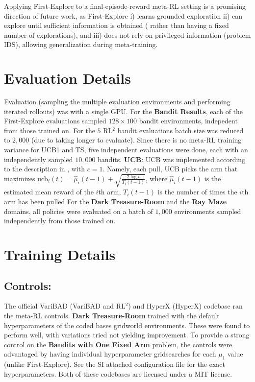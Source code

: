 \documentclass{article}
\begin{document}
Applying First-Explore to a final-episode-reward meta-RL setting is a promising direction of future work, as First-Explore i) learns grounded exploration ii) can explore until sufficient information is obtained ( rather than having a fixed number of explorations), and iii) does not rely on privileged information (problem IDS), allowing generalization during meta-training.
\FloatBarrier
\section{Evaluation Details} \label{ap:evaldet}
Evaluation (sampling the multiple evaluation environments and performing iterated rollouts) was with a single GPU. For the \textbf{Bandit Results}, each of the First-Explore evaluations sampled \(128 \times 100\) bandit environments, indepedent from those trained on. For the \(5\) RL\(^2\) bandit evaluations batch size was reduced to \(2,000\) (due to taking longer to evaluate). Since there is no meta-RL training variance for UCB1 and TS, five independent evaluations were done, each with an independently sampled \(10,000\) bandits.
\textbf{UCB}: UCB was implemented according to the description in \cite{rl2}, with \(c=1\). Namely, each pull, UCB picks the arm that maximizes \(\text{ucb}_i(t) = \hat{\mu}_i(t - 1) + \sqrt{\frac{2\log t}{T_i(t-1)}}\), where \(\hat{\mu}_i(t - 1)\) is the estimated mean reward of the \(i\)th arm, \(T_i(t-1)\) is the number of times the \(i\)th arm has been pulled
For the \textbf{Dark Treasure-Room} and the \textbf{Ray Maze} domains, all policies were evaluated on a batch of \(1,000\) environments sampled independently from those trained on.
\section{Training Details}
\label{app:training}
\subsection{Controls:}
The official VariBAD \cite{VariBAD} (VariBAD and RL\(^2\)) and HyperX \cite{hyperx} (HyperX) codebase ran the meta-RL controls. \textbf{Dark Treasure-Room} trained with the default hyperparameters of the coded bases gridworld environments. These were found to perform well, with variations tried not yielding improvement. To provide a strong control on the \textbf{Bandits with One Fixed Arm} problem, the controls were advantaged by having individual hyperparameter gridsearches for each \(\mu_1\) value (unlike First-Explore). See the SI attached configuration file for the exact hyperparameters. Both of these codebases are licensed under a MIT license.
\end{document}
